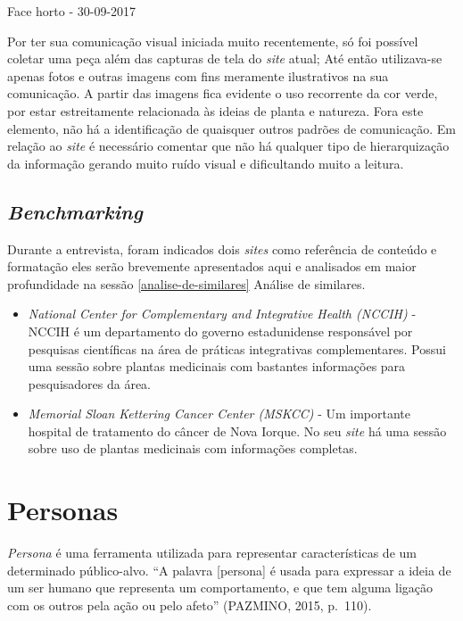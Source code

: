 Face horto - 30-09-2017

Por ter sua comunicação visual iniciada muito recentemente, só foi possível coletar uma peça além das capturas de tela do \emph{site} atual; Até então utilizava-se apenas fotos e outras imagens com fins meramente ilustrativos na sua comunicação. A partir das imagens fica evidente o uso recorrente da cor verde, por estar estreitamente relacionada às ideias de planta e natureza. Fora este elemento, não há a identificação de quaisquer outros padrões de comunicação. Em relação ao \emph{site} é necessário comentar que não há qualquer tipo de hierarquização da informação gerando muito ruído visual e dificultando muito a leitura.

\subsection{\texorpdfstring{\emph{Benchmarking}}{Benchmarking}}\label{benchmarking}

Durante a entrevista, foram indicados dois \emph{sites} como referência de conteúdo e formatação eles serão brevemente apresentados aqui e analisados em maior profundidade na sessão \ref{analise-de-similares} Análise de similares.

\begin{itemize}
\tightlist
\item
  \emph{National Center for Complementary and Integrative Health (NCCIH)} - NCCIH é um departamento do governo estadunidense responsável por pesquisas científicas na área de práticas integrativas complementares. Possui uma sessão sobre plantas medicinais com bastantes informações para pesquisadores da área.
\item
  \emph{Memorial Sloan Kettering Cancer Center (MSKCC)} - Um importante hospital de tratamento do câncer de Nova Iorque. No seu \emph{site} há uma sessão sobre uso de plantas medicinais com informações completas.
\end{itemize}

\section{Personas}\label{personas}

\emph{Persona} é uma ferramenta utilizada para representar características de um determinado público-alvo. ``A palavra {[}persona{]} é usada para expressar a ideia de um ser humano que representa um comportamento, e que tem alguma ligação com os outros pela ação ou pelo afeto'' (PAZMINO, 2015, p.~110).

